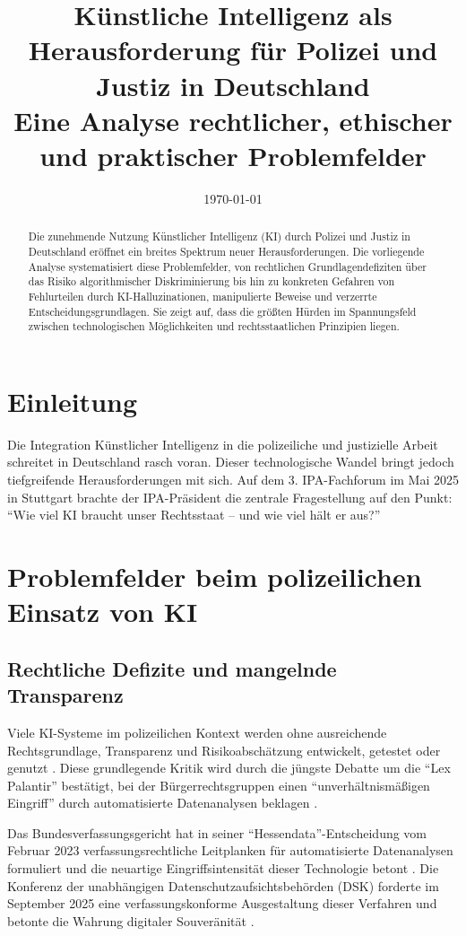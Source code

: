 \documentclass[12pt,a4paper]{article}
\title{Künstliche Intelligenz als Herausforderung für Polizei und Justiz in Deutschland\\
	\large Eine Analyse rechtlicher, ethischer und praktischer Problemfelder}
\author{}
\date{\today}
\begin{document}
	
	\maketitle
	
	\begin{abstract}
		Die zunehmende Nutzung Künstlicher Intelligenz (KI) durch Polizei und Justiz in Deutschland eröffnet ein breites Spektrum neuer Herausforderungen. Die vorliegende Analyse systematisiert diese Problemfelder, von rechtlichen Grundlagendefiziten über das Risiko algorithmischer Diskriminierung bis hin zu konkreten Gefahren von Fehlurteilen durch KI-Halluzinationen, manipulierte Beweise und verzerrte Entscheidungsgrundlagen. Sie zeigt auf, dass die größten Hürden im Spannungsfeld zwischen technologischen Möglichkeiten und rechtsstaatlichen Prinzipien liegen.
	\end{abstract}
	
	\section{Einleitung}
	
	Die Integration Künstlicher Intelligenz in die polizeiliche und justizielle Arbeit schreitet in Deutschland rasch voran. Dieser technologische Wandel bringt jedoch tiefgreifende Herausforderungen mit sich. Auf dem 3. IPA-Fachforum im Mai 2025 in Stuttgart brachte der IPA-Präsident die zentrale Fragestellung auf den Punkt: \enquote{Wie viel KI braucht unser Rechtsstaat – und wie viel hält er aus?} \cite{IPA2025}
	
	\section{Problemfelder beim polizeilichen Einsatz von KI}
	
	\subsection{Rechtliche Defizite und mangelnde Transparenz}
	
	Viele KI-Systeme im polizeilichen Kontext werden ohne ausreichende Rechtsgrundlage, Transparenz und Risikoabschätzung entwickelt, getestet oder genutzt \cite{Peteranderl2025}. Diese grundlegende Kritik wird durch die jüngste Debatte um die \enquote{Lex Palantir} bestätigt, bei der Bürgerrechtsgruppen einen \enquote{unverhältnismäßigen Eingriff} durch automatisierte Datenanalysen beklagen \cite{FR2026}.
	
	Das Bundesverfassungsgericht hat in seiner \enquote{Hessendata}-Entscheidung vom Februar 2023 verfassungsrechtliche Leitplanken für automatisierte Datenanalysen formuliert und die neuartige Eingriffsintensität dieser Technologie betont \cite{VerfBlog2026}. Die Konferenz der unabhängigen Datenschutzaufsichtsbehörden (DSK) forderte im September 2025 eine verfassungskonforme Ausgestaltung dieser Verfahren und betonte die Wahrung digitaler Souveränität \cite{DSK2025}.
	
\end{document}
